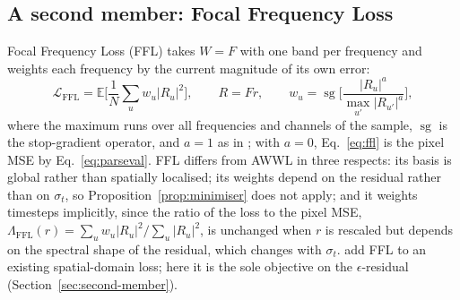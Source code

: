 \subsection{A second member: Focal Frequency Loss}
\label{sec:family-ffl}

Focal Frequency Loss (FFL) \citep{jiang2021focal} takes $W = F$ with one band
per frequency and weights each frequency by the current magnitude of its own
error:
\begin{equation}
  \mathcal{L}_{\mathrm{FFL}}
  = \mathbb{E}\Big[\frac{1}{N} \sum_{u} w_u \lvert R_u \rvert^2\Big],
  \qquad R = F r,
  \qquad w_u = \operatorname{sg}\bigg[\frac{\lvert R_u \rvert^{a}}{\max_{u'} \lvert R_{u'} \rvert^{a}}\bigg],
  \label{eq:ffl}
\end{equation}
where the maximum runs over all frequencies and channels of the sample,
$\operatorname{sg}$ is the stop-gradient operator, and $a = 1$ as in
\citet{jiang2021focal}; with $a = 0$, Eq.~\eqref{eq:ffl} is the pixel MSE by
Eq.~\eqref{eq:parseval}. FFL differs from AWWL in three respects: its basis is
global rather than spatially localised; its weights depend on the residual
rather than on $\sigma_t$, so Proposition~\ref{prop:minimiser} does not
apply; and it weights timesteps implicitly, since the ratio of the loss to
the pixel MSE,
$\Lambda_{\mathrm{FFL}}(r) = \sum_u w_u \lvert R_u \rvert^2 / \sum_u \lvert R_u \rvert^2$,
is unchanged when $r$ is rescaled but depends on the spectral shape of the
residual, which changes with $\sigma_t$. \citet{jiang2021focal} add FFL to an
existing spatial-domain loss; here it is the sole objective on the
$\epsilon$-residual (Section~\ref{sec:second-member}).
